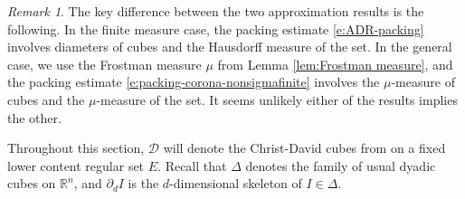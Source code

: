\documentclass[11pt,reqno]{amsart}
\theoremstyle{definition}
\theoremstyle{remark}
\newtheorem{remark}[theorem]{Remark}
\numberwithin{equation}{section}
\newcommand{\R}{\mathbb{R}}
\newcommand{\dD}{\mathcal{D}}
\theoremstyle{theorem}
\theoremstyle{definition}
\theoremstyle{remark}
\numberwithin{equation}{section}
\begin{document}
\begin{remark}
    The key difference between the two approximation results is the following. In the finite measure case, the packing estimate \eqref{e:ADR-packing} involves diameters of cubes and the Hausdorff measure of the set. In the general case, we use the Frostman measure $\mu$ from Lemma \ref{lem:Frostman measure}, and the packing estimate \eqref{e:packing-corona-nonsigmafinite} involves the $\mu$-measure of cubes and the $\mu$-measure of the set. It seems unlikely either of the results implies the other.
\end{remark}

Throughout this section, $\dD$ will denote the Christ-David cubes from  on a fixed lower content regular set $E$. Recall that $\Delta$ denotes the family of usual dyadic cubes on $\R^n$, and $\partial_d I$ is the $d$-dimensional skeleton of $I\in\Delta$.
\end{document}
